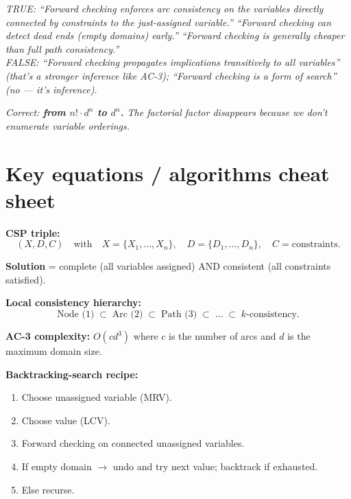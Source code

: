 \documentclass[11pt, a4paper]{article}
\begin{document}
\begin{exambox}
\textit{TRUE: ``Forward checking enforces arc consistency on the variables directly connected by constraints to the just-assigned variable.'' ``Forward checking can detect dead ends (empty domains) early.'' ``Forward checking is generally cheaper than full path consistency.''}\\[0.3em]
\textit{FALSE: ``Forward checking propagates implications transitively to all variables'' (that's a stronger inference like AC-3); ``Forward checking is a form of search'' (no — it's inference).}
\end{exambox}

\begin{exambox}
\textit{Correct: \textbf{from $n! \cdot d^n$ to $d^n$.} The factorial factor disappears because we don't enumerate variable orderings.}
\end{exambox}

\section*{Key equations / algorithms cheat sheet}

\textbf{CSP triple:}
\[
(X, D, C) \quad \text{with} \quad X = \{X_1, \dots, X_n\}, \quad D = \{D_1, \dots, D_n\}, \quad C = \text{constraints}.
\]

\textbf{Solution} = complete (all variables assigned) AND consistent (all constraints satisfied).

\textbf{Local consistency hierarchy:}
\[
\text{Node (1)} \;\subset\; \text{Arc (2)} \;\subset\; \text{Path (3)} \;\subset\; \dots \;\subset\; k\text{-consistency}.
\]

\textbf{AC-3 complexity:} $O(c d^3)$ where $c$ is the number of arcs and $d$ is the maximum domain size.

\textbf{Backtracking-search recipe:}
\begin{enumerate}[itemsep=0pt, topsep=0pt]
  \item Choose unassigned variable (MRV).
  \item Choose value (LCV).
  \item Forward checking on connected unassigned variables.
  \item If empty domain $\to$ undo and try next value; backtrack if exhausted.
  \item Else recurse.
\end{enumerate}
\end{document}
